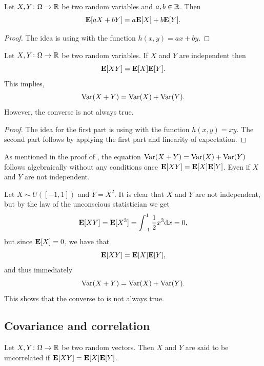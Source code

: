\documentclass[11pt,a4paper]{article}
\begin{document}
\begin{corollary}
  Let $X,Y \colon \Omega \to \mathbb{R}$ be two random variables and $a,b \in \mathbb{R}$.
  Then
  \[
    \mathbf{E}[aX + bY] = a \mathbf{E}[X] + b \mathbf{E}[Y].
  \]
\end{corollary}
\begin{proof}
  The idea is using  with
  the function $h(x,y) = ax + by$.
\end{proof}

\begin{corollary}
  \label{cor:exy-exey}
  Let $X,Y \colon \Omega \to \mathbb{R}$ be two random variables.
  If $X$ and $Y$ are independent then
  \[
    \mathbf{E}[XY] = \mathbf{E}[X] \mathbf{E}[Y].
  \]
  This implies, 
  \[
    \operatorname{Var}(X + Y) = \operatorname{Var}(X) + \operatorname{Var}(Y).
  \]
  However, the converse is not always true.
\end{corollary}
\begin{proof}
  The idea for the first part is using  with
  the function $h(x,y) = xy$.
  The second part follows by applying the first part and linearity
  of expectation.
\end{proof}

\begin{remark}
  As mentioned in the proof of ,
  the equation $\operatorname{Var}(X + Y) = \operatorname{Var}(X) + \operatorname{Var}(Y)$
  follows algebraically without any conditions
  once $\mathbf{E}[XY] = \mathbf{E}[X] \mathbf{E}[Y]$.
  Even if $X$ and $Y$ are not independent.
\end{remark}

\begin{example}
  \label{exmp:uncorrelated-but-not-independent}
  Let $X \sim U([-1,1])$ and $Y = X^2$. It is clear that $X$ and $Y$
  are not independent, but by the law of the unconscious statistician
  we get
  \[
    \E[XY] =
    \E[X^3] =
    \int_{-1}^{1} \frac{1}{2} x^3 \dx =
    0,
  \]
  but since $\mathbf{E}[X] = 0$, we have that
  \[
    \mathbf{E}[XY] = \mathbf{E}[X] \mathbf{E}[Y],
  \]
  and thus immediately
  \[
    \operatorname{Var}(X + Y) = \operatorname{Var}(X) + \operatorname{Var}(Y).
  \]
  This shows that the converse to  is not always true.
\end{example}

\subsection{Covariance and correlation}

\begin{definition}[Uncorrelatedness]
  Let $X,Y \colon \Omega \to \mathbb{R}$ be two random vectors.
  Then $X$ and $Y$ are said to be uncorrelated if $\mathbf{E}[XY] = \mathbf{E}[X] \mathbf{E}[Y]$.
\end{definition}
\end{document}
